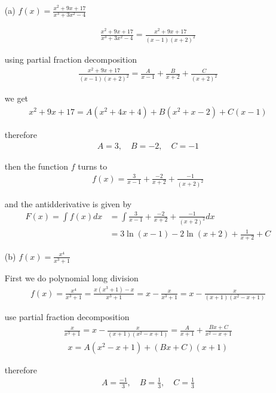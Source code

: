 \begin{enumerate}

\item[(a)]$f(x)=\frac{x^2+9x+17}{x^3+3x^2-4}$

\begin{align}
\frac{x^2+9x+17}{x^3+3x^2-4}=\frac{x^2+9x+17}{(x-1)(x+2)^2}
\end{align}

using partial fraction decomposition
\begin{align}
\frac{x^2+9x+17}{(x-1)(x+2)^2}=\frac{A}{x-1}+\frac{B}{x+2}+\frac{C}{(x+2)^2}
\end{align}

we get
\begin{align}
x^2+9x+17=A(x^2+4x+4)+B(x^2+x-2)+C(x-1)
\end{align}

therefore
\begin{align}
A=3,\hspace{1em}
B=-2,\hspace{1em}
C=-1
\end{align}

then the function $f$ turns to
\begin{align}
f(x)=\frac{3}{x-1}+\frac{-2}{x+2}+\frac{-1}{(x+2)^2}
\end{align}

and the antidderivative is given by
\begin{align}
F(x)=\int f(x)dx
&=\int \frac{3}{x-1}+\frac{-2}{x+2}+\frac{-1}{(x+2)^2}dx \\
&=3\ln(x-1)-2\ln(x+2)+\frac{1}{x+2}+C
\end{align}

\newpage

\item[(b)]$f(x)=\frac{x^4}{x^3+1}$

First we do polynomial long division
\begin{align}
f(x)=\frac{x^4}{x^3+1}=\frac{x(x^3+1)-x}{x^3+1}=x-\frac{x}{x^3+1}=x-\frac{x}{(x+1)(x^2-x+1)}
\end{align}

use partial fraction decomposition
\begin{align}
\frac{x}{x^3+1}=x-\frac{x}{(x+1)(x^2-x+1)}=\frac{A}{x+1}+\frac{Bx+C}{x^2-x+1}
\end{align}
\begin{align}
x=A(x^2-x+1)+(Bx+C)(x+1)
\end{align}

therefore
\begin{align}
A=\frac{-1}{3},\hspace{1em}
B=\frac{1}{3},\hspace{1em}
C=\frac{1}{3}
\end{align}


\end{enumerate}
